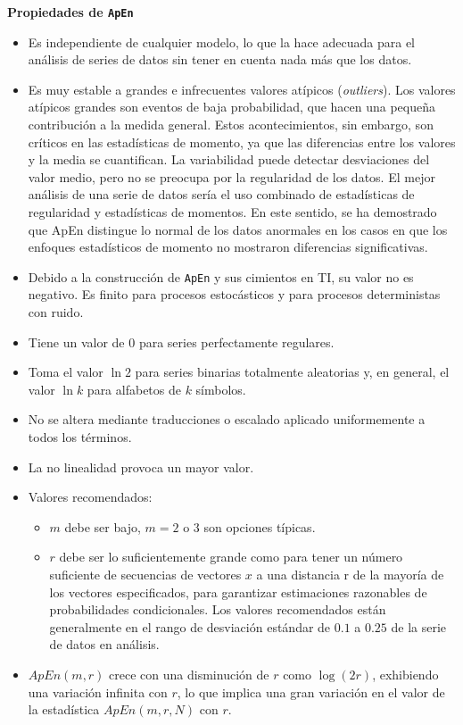 \documentclass[a4paper,12pt]{article}
\begin{document}
\textbf{Propiedades de \texttt{ApEn}}
\begin{itemize}
	\item Es independiente de cualquier modelo, lo que la hace adecuada para el análisis de series de datos sin tener en cuenta nada más que los datos.
	\item Es muy estable a grandes e infrecuentes valores atípicos (\textit{outliers}). Los valores atípicos grandes son eventos de baja probabilidad, que hacen una pequeña contribución a la medida general. Estos acontecimientos, sin embargo, son críticos en las estadísticas de momento, ya que las diferencias entre los valores y la media se cuantifican. La variabilidad puede detectar desviaciones del valor medio, pero no se preocupa por la regularidad de los datos. El mejor análisis de una serie de datos sería el uso combinado de estadísticas de regularidad y estadísticas de momentos. En este sentido, se ha demostrado que ApEn distingue lo normal de los datos anormales en los casos en que los enfoques estadísticos de momento no mostraron diferencias significativas.
	\item Debido a la construcción de \texttt{ApEn} y sus cimientos en TI, su valor no es negativo. Es finito para procesos estocásticos y para procesos deterministas con ruido. 
	\item Tiene un valor de 0 para series perfectamente regulares. 
	\item Toma el valor $\ln 2$ para series binarias totalmente aleatorias y, en general, el valor $\ln k$ para alfabetos de $k$ símbolos. 
	\item No se altera mediante traducciones o escalado aplicado uniformemente a todos los términos.
	\item La no linealidad provoca un mayor valor. 
	\item Valores recomendados: 
	\begin{itemize}
		\item $m$ debe ser bajo, $m = 2$ o $3$ son opciones típicas.
		\item $r$ debe ser lo suficientemente grande como para tener un número suficiente de secuencias de vectores $x$ a una distancia r de la mayoría de los vectores especificados, para garantizar estimaciones razonables de probabilidades condicionales. Los valores recomendados están generalmente en el rango de desviación estándar de $0.1$ a $0.25$ de la serie de datos en análisis.
	\end{itemize}
	\item $ApEn(m, r)$ crece con una disminución de $r$ como $\log(2r)$, exhibiendo una variación infinita con $r$, lo que implica una gran variación en el valor de la estadística $ApEn(m, r, N)$ con $r$.

\end{itemize}
\end{document}
